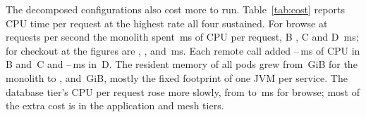 The decomposed configurations also cost more to run. Table~\ref{tab:cost} reports CPU time per request at the
highest rate all four sustained. For browse at  requests per second the monolith spent
\,ms of CPU per request, B , C
 and D \,ms; for checkout at  the
figures are , ,  and
\,ms. Each remote call added --\,ms of
CPU in B and~C and --\,ms in~D. The resident memory of all pods
grew from \,GiB for the monolith to ,  and
\,GiB, mostly the fixed footprint of one JVM per service. The database tier's CPU per request
rose more slowly, from  to \,ms for browse; most of the extra
cost is in the application and mesh tiers.
